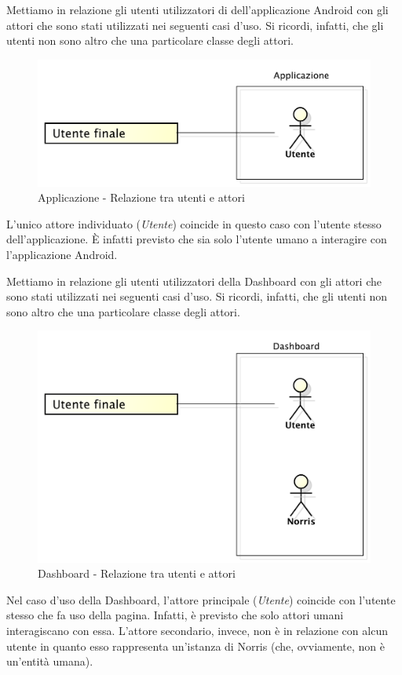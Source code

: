 	Mettiamo in relazione gli utenti utilizzatori di dell'applicazione Android con gli attori che sono stati utilizzati nei seguenti casi d'uso. Si ricordi, infatti, che gli utenti non sono altro che una particolare classe degli attori.
	\begin{figure}[H]
		\centering
		\includegraphics[scale=0.4]{Pics/UtentiAttoriApplicazione}
		\caption{Applicazione - Relazione tra utenti e attori}
	\end{figure}
	L'unico attore individuato (\emph{Utente}) coincide in questo caso con l'utente stesso dell'applicazione. È infatti previsto che sia solo l'utente umano a interagire con l'applicazione Android.
	

	Mettiamo in relazione gli utenti utilizzatori della Dashboard con gli attori che sono stati utilizzati nei seguenti casi d'uso. Si ricordi, infatti, che gli utenti non sono altro che una particolare classe degli attori.
	\begin{figure}[H]
		\centering
		\includegraphics[scale=0.4]{Pics/UtentiAttoriDashboard}
		\caption{Dashboard - Relazione tra utenti e attori}
	\end{figure}
	Nel caso d'uso della Dashboard, l'attore principale (\emph{Utente}) coincide con l'utente stesso che fa uso della pagina. Infatti, è previsto che solo attori umani interagiscano con essa. L'attore secondario, invece, non è in relazione con alcun utente in quanto esso rappresenta un'istanza di Norris (che, ovviamente, non è un'entità umana).
	